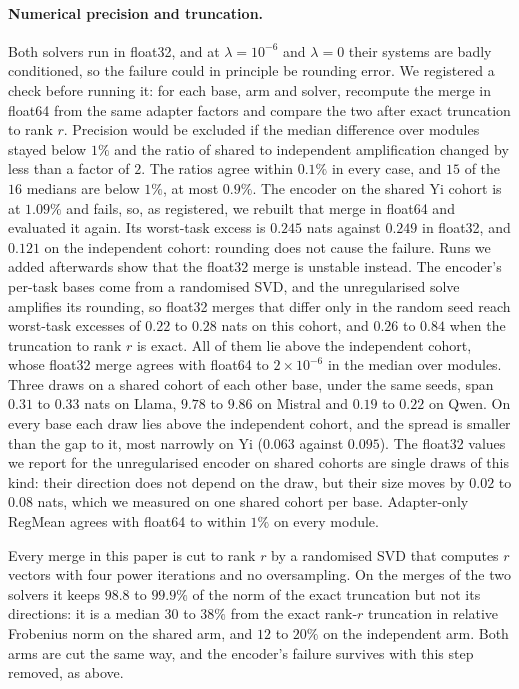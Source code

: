 \paragraph{Numerical precision and truncation.} Both solvers run in float32,
and at $\lambda = 10^{-6}$ and $\lambda = 0$ their systems are badly
conditioned, so the failure could in principle be rounding error. We
registered a check before running it: for each base, arm and solver, recompute
the merge in float64 from the same adapter factors and compare the two after
exact truncation to rank $r$. Precision would be excluded if the median
difference over modules stayed below $1\%$ and the ratio of shared to
independent amplification changed by less than a factor of $2$. The ratios
agree within $0.1\%$ in every case, and $15$ of the $16$ medians are below
$1\%$, at most $0.9\%$. The encoder on the shared Yi cohort is at $1.09\%$ and
fails, so, as registered, we rebuilt that merge in float64 and evaluated it
again. Its worst-task excess is $0.245$ nats against $0.249$ in float32, and
$0.121$ on the independent cohort: rounding does not cause the failure. Runs
we added afterwards show that the float32 merge is unstable instead. The
encoder's per-task bases come from a randomised SVD, and the unregularised
solve amplifies its rounding, so float32 merges that differ only in the random
seed reach worst-task excesses of $0.22$ to $0.28$ nats on this cohort, and
$0.26$ to $0.84$ when the truncation to rank $r$ is exact. All of them lie
above the independent cohort, whose float32 merge agrees with float64 to
$2\times10^{-6}$ in the median over modules. Three draws on a shared cohort of each other base, under the
same seeds, span $0.31$ to $0.33$ nats on Llama, $9.78$ to $9.86$ on Mistral and
$0.19$ to $0.22$ on Qwen. On every base each draw lies above the independent
cohort, and the spread is smaller than the gap to it, most narrowly on Yi
($0.063$ against $0.095$). The float32 values we report for the unregularised
encoder on shared cohorts are single draws of this kind: their direction does
not depend on the draw, but their size moves by $0.02$ to $0.08$ nats, which we
measured on one shared cohort per base. Adapter-only RegMean agrees with
float64 to within $1\%$ on every module.

Every merge in this paper is cut to rank $r$ by a randomised SVD that computes
$r$ vectors with four power iterations and no oversampling. On the merges of
the two solvers it keeps $98.8$ to $99.9\%$ of the norm of the exact
truncation but not its directions: it is a median $30$ to $38\%$ from the exact
rank-$r$ truncation in relative Frobenius norm on the shared arm, and $12$ to
$20\%$ on the independent arm. Both arms are cut the same way, and the
encoder's failure survives with this step removed, as above.

